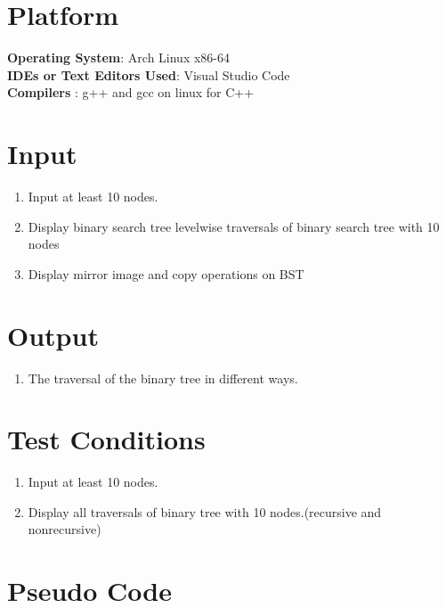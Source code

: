 \documentclass[11pt]{article}
\begin{document}
\section{Platform}
\textbf{Operating System}: Arch Linux x86-64 \\
\textbf{IDEs or Text Editors Used}: Visual Studio Code\\
\textbf{Compilers} : g++ and gcc on linux for C++\\

\section{Input}
\begin{enumerate}
	\item Input at least 10 nodes.
	\item Display binary search tree levelwise traversals of binary search tree with 10 nodes
	\item Display mirror image and copy operations on BST
\end{enumerate}
\section{Output}
\begin{enumerate}
	\item The traversal of the binary tree in different ways.
\end{enumerate}

\section{Test Conditions}
\begin{enumerate}
	\item Input at least 10 nodes.
	\item Display all traversals of binary tree with 10 nodes.(recursive and nonrecursive)
\end{enumerate}

\section{Pseudo Code}
\end{document}
